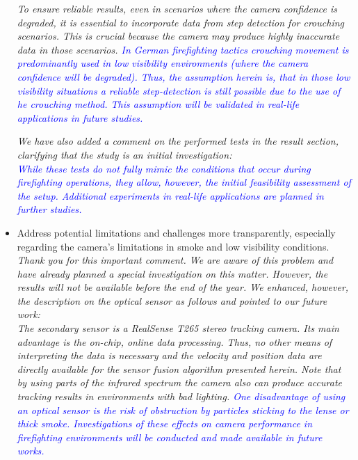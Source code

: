\documentclass{article}
\begin{document}
\begin{itemize}
\textit{To ensure reliable results, even in scenarios where the camera confidence is degraded, it is essential to incorporate data from step detection for crouching scenarios. This is crucial because the camera  may produce highly inaccurate data in those scenarios. \textcolor{blue}{In German firefighting tactics crouching movement is predominantly used in low visibility environments (where the camera confidence will be degraded). Thus, the assumption herein is, that in those low visibility situations a reliable step-detection is still possible due to the use of he crouching method. This assumption will be validated in real-life applications in future studies.}}

\textit{
We have also added a comment on the performed tests in the result section, clarifying that the study is an initial investigation:
\\
\textcolor{blue}{While these tests do not fully mimic the conditions that occur during firefighting operations, they allow, however, the initial feasibility assessment of the setup. Additional experiments in real-life applications are planned in further studies.}}


\item Address potential limitations and challenges more transparently, especially regarding the camera's limitations in smoke and low visibility conditions.\\



\textit{Thank you for this important comment. We are aware of this problem and have already planned a special investigation on this matter. However, the results will not be available before the end of the year.  We enhanced, however,  the description on the optical sensor as follows and pointed to our future work:\\	
	The secondary sensor is a RealSense T265 stereo tracking camera. Its main advantage is the on-chip, online data processing. Thus, no other means of interpreting the data is necessary and the velocity and position data are directly available for the sensor  fusion algorithm presented herein. Note that by using parts of the infrared spectrum the camera also can produce accurate tracking results in environments with bad lighting. \textcolor{blue}{One disadvantage of using an optical sensor is the risk of obstruction by particles sticking to the lense or thick smoke.  Investigations of these effects on camera performance in firefighting environments will be conducted and made available in  future works.}}\\




\end{itemize}
\end{document}
